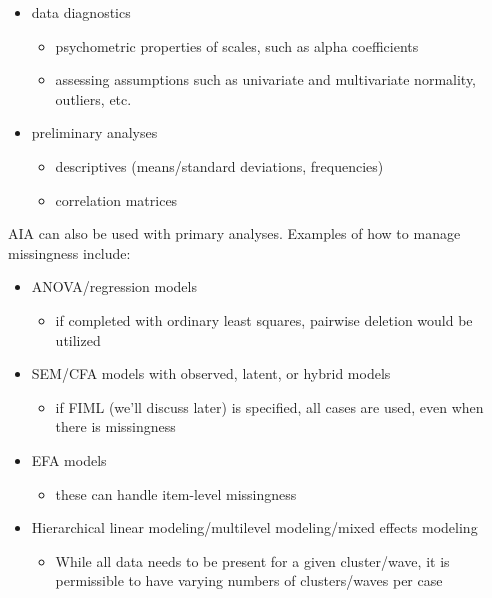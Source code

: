 \documentclass[
  english,
]{book}
\providecommand{\tightlist}{%
  \setlength{\itemsep}{0pt}\setlength{\parskip}{0pt}}
\begin{document}
\begin{itemize}
\tightlist
\item
  data diagnostics

  \begin{itemize}
  \tightlist
  \item
    psychometric properties of scales, such as alpha coefficients
  \item
    assessing assumptions such as univariate and multivariate normality, outliers, etc.
  \end{itemize}
\item
  preliminary analyses

  \begin{itemize}
  \tightlist
  \item
    descriptives (means/standard deviations, frequencies)
  \item
    correlation matrices
  \end{itemize}
\end{itemize}

AIA can also be used with primary analyses. Examples of how to manage missingness include:

\begin{itemize}
\tightlist
\item
  ANOVA/regression models

  \begin{itemize}
  \tightlist
  \item
    if completed with ordinary least squares, pairwise deletion would be utilized
  \end{itemize}
\item
  SEM/CFA models with observed, latent, or hybrid models

  \begin{itemize}
  \tightlist
  \item
    if FIML (we'll discuss later) is specified, all cases are used, even when there is missingness
  \end{itemize}
\item
  EFA models

  \begin{itemize}
  \tightlist
  \item
    these can handle item-level missingness
  \end{itemize}
\item
  Hierarchical linear modeling/multilevel modeling/mixed effects modeling

  \begin{itemize}
  \tightlist
  \item
    While all data needs to be present for a given cluster/wave, it is permissible to have varying numbers of clusters/waves per case
  \end{itemize}
\end{itemize}
\end{document}
